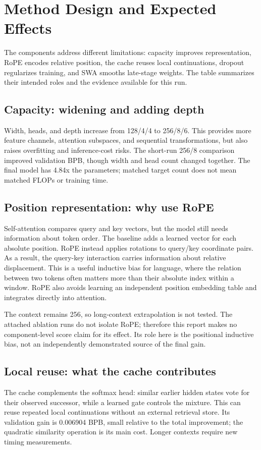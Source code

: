 \documentclass[11pt]{article}
\begin{document}
\section{Method Design and Expected Effects}
The components address different limitations: capacity improves representation, RoPE encodes relative position, the cache reuses local continuations, dropout regularizes training, and SWA smooths late-stage weights. The table summarizes their intended roles and the evidence available for this run.

\subsection{Capacity: widening and adding depth}
Width, heads, and depth increase from 128/4/4 to 256/8/6. This provides more feature channels, attention subspaces, and sequential transformations, but also raises overfitting and inference-cost risks. The short-run 256/8 comparison improved validation BPB, though width and head count changed together. The final model has 4.84x the parameters; matched target count does not mean matched FLOPs or training time.

\subsection{Position representation: why use RoPE}
Self-attention compares query and key vectors, but the model still needs information about token order. The baseline adds a learned vector for each absolute position. RoPE instead applies rotations to query/key coordinate pairs. As a result, the query-key interaction carries information about relative displacement. This is a useful inductive bias for language, where the relation between two tokens often matters more than their absolute index within a window. RoPE also avoids learning an independent position embedding table and integrates directly into attention.

The context remains 256, so long-context extrapolation is not tested. The attached ablation runs do not isolate RoPE; therefore this report makes no component-level score claim for its effect. Its role here is the positional inductive bias, not an independently demonstrated source of the final gain.

\subsection{Local reuse: what the cache contributes}
The cache complements the softmax head: similar earlier hidden states vote for their observed successor, while a learned gate controls the mixture. This can reuse repeated local continuations without an external retrieval store. Its validation gain is 0.006904 BPB, small relative to the total improvement; the quadratic similarity operation is its main cost. Longer contexts require new timing measurements.
\end{document}
